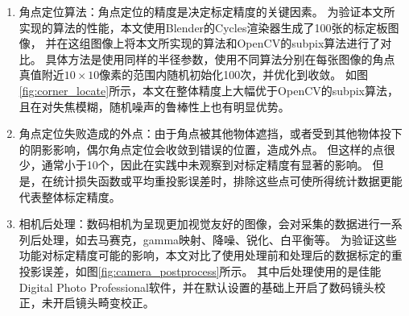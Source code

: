 \begin{enumerate}
\item 角点定位算法：角点定位的精度是决定标定精度的关键因素。
为验证本文所实现的算法的性能，本文使用Blender的Cycles渲染器生成了100张的标定板图像，
并在这组图像上将本文所实现的算法和OpenCV的subpix算法进行了对比。
具体方法是使用同样的半径参数，使用不同算法分别在每张图像的角点真值附近$10\times 10$像素的范围内随机初始化100次，并优化到收敛。
如图\ref{fig:corner_locate}所示，本文在整体精度上大幅优于OpenCV的subpix算法，且在对失焦模糊，随机噪声的鲁棒性上也有明显优势。

\item 角点定位失败造成的外点：由于角点被其他物体遮挡，或者受到其他物体投下的阴影影响，偶尔角点定位会收敛到错误的位置，造成外点。
但这样的点很少，通常小于10个，因此在实践中未观察到对标定精度有显著的影响。
但是，在统计损失函数或平均重投影误差时，排除这些点可使所得统计数据更能代表整体标定精度。

\item 相机后处理：数码相机为呈现更加视觉友好的图像，会对采集的数据进行一系列后处理，如去马赛克，gamma映射、降噪、锐化、白平衡等。
为验证这些功能对标定精度可能的影响，本文对比了使用处理前和处理后的数据标定的重投影误差，如图\ref{fig:camera_postprocess}所示。
其中后处理使用的是佳能Digital Photo Professional软件，并在默认设置的基础上开启了数码镜头校正，未开启镜头畸变校正。
\end{enumerate}
